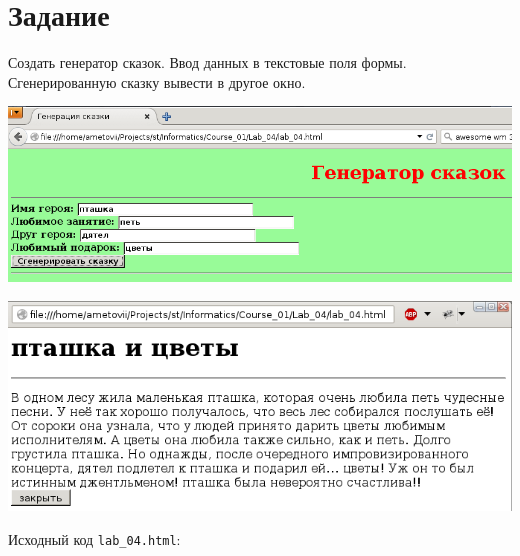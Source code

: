 \section{Задание}

Создать генератор сказок. Ввод данных в текстовые поля формы. Сгенерированную сказку вывести в другое окно.

\begin{center}
  \includegraphics[width=15cm]{img/01.png}

  \includegraphics[width=15cm]{img/02.png}
\end{center}

Исходный код \verb|lab_04.html|:

